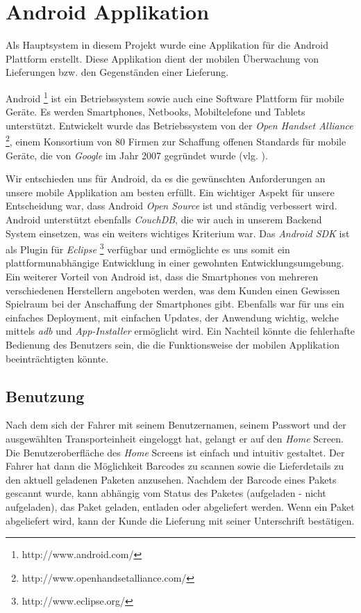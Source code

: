 \section{Android Applikation}
\label{sec:android}

Als Hauptsystem in diesem Projekt wurde eine Applikation für die Android
	Plattform erstellt. Diese Applikation dient der mobilen Überwachung
	von Lieferungen bzw. den Gegenständen einer Lieferung.

Android \footnote{http://www.android.com/} ist ein Betriebssystem sowie auch eine Software Plattform für mobile Geräte.
Es werden Smartphones, Netbooks, Mobiltelefone und Tablets unterstützt. Entwickelt wurde das Betriebssystem von der
\emph{Open Handset Alliance} \footnote{http://www.openhandsetalliance.com/}, einem Konsortium von 80 Firmen zur Schaffung offenen Standards 
für mobile Geräte, die von \emph{Google} im Jahr 2007 gegründet wurde (vlg. \cite{OHA07}). 

Wir entschieden uns für Android, da es die gewünschten Anforderungen an unsere mobile Applikation am besten erfüllt. 
Ein wichtiger Aspekt für unsere Entscheidung war, dass Android \emph{Open Source} ist und ständig verbessert wird.
Android unterstützt ebenfalls \emph{CouchDB}, die wir auch in unserem Backend System einsetzen, was ein weiters wichtiges Kriterium war.
Das \emph{Android SDK} ist als Plugin für \emph{Eclipse} \footnote{http://www.eclipse.org/} verfügbar und ermöglichte es uns somit ein 
plattformunabhängige Entwicklung in einer gewohnten Entwicklungsumgebung. Ein weiterer Vorteil von Android ist, dass die Smartphones von
mehreren verschiedenen Herstellern angeboten werden, was dem Kunden einen Gewissen Spielraum bei der Anschaffung der Smartphones gibt.
Ebenfalls war für uns ein einfaches Deployment, mit einfachen Updates, der Anwendung wichtig, welche mittels \emph{adb} und \emph{App-Installer}
ermöglicht wird. Ein Nachteil könnte die fehlerhafte Bedienung des Benutzers sein, die die Funktionsweise der mobilen Applikation beeinträchtigten könnte.

\subsection{Benutzung}

Nach dem sich der Fahrer mit seinem Benutzernamen, seinem Passwort und der ausgewählten Transporteinheit eingeloggt hat, gelangt er auf den \emph{Home} Screen.
Die Benutzeroberfläche des \emph{Home} Screens ist einfach und intuitiv gestaltet. Der Fahrer hat dann die Möglichkeit 
Barcodes zu scannen sowie die Lieferdetails zu den aktuell geladenen Paketen anzusehen.
Nachdem der Barcode eines Pakets gescannt wurde, kann abhängig vom Status des Paketes (aufgeladen - nicht aufgeladen), das Paket
geladen, entladen oder abgeliefert werden. Wenn ein Paket abgeliefert wird, kann der Kunde die Lieferung mit seiner Unterschrift bestätigen.

